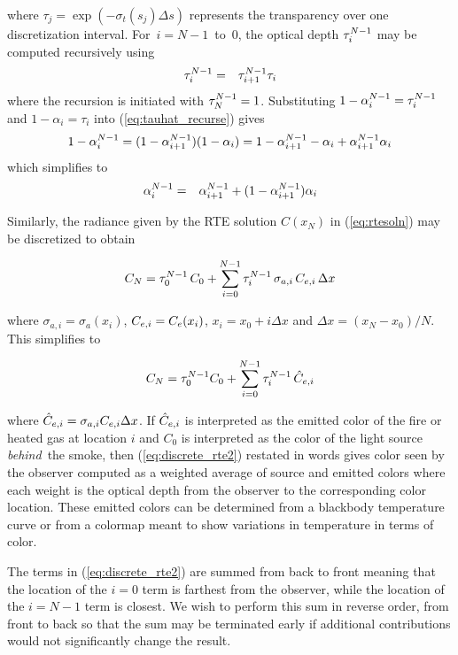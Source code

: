 \noindent where $\tau_j=\exp\left(-\sigma_t(s_j)\Delta s\right)$
represents the transparency over one discretization interval.
For~$i=N-1$~to~$0$, the optical depth $\tau_{i}^{N-1}$ may be computed
recursively using
\begin{eqnarray}
\label{eq:tauhat_recurse}
\tau_{i}^{N-1}&=&\tau_{i+1}^{N-1}\tau_i
\end{eqnarray}
\noindent where the recursion is initiated with $\tau_{N}^{N-1}=1$.
Substituting $1-\alpha_{i}^{N-1}=\tau_{i}^{N-1}$ and $1-\alpha_i=\tau_i$ into
(\ref{eq:tauhat_recurse}) gives
\begin{eqnarray}
1-\alpha_{i}^{N-1}=(1-\alpha_{i+1}^{N-1})(1-\alpha_i)=1-\alpha_{i+1}^{N-1} - \alpha_i + \alpha_{i+1}^{N-1}\alpha_i
\end{eqnarray}
which simplifies to
\begin{eqnarray}
\label{eq:alpha2}
\alpha_{i}^{N-1}&=&\alpha_{i+1}^{N-1} + (1-\alpha_{i+1}^{N-1})\alpha_i
\end{eqnarray}

Similarly, the radiance given by the RTE solution $C(x_N)$ in
(\ref{eq:rtesoln}) may be discretized to obtain

\begin{eqnarray}
C_{N} = \tau_{0}^{N-1}\,C_0 +
\sum_{i=0}^{N-1}\tau_{i}^{N-1}\,\sigma_{a,i}\,C_{e,i}\,\Delta x
\end{eqnarray}

\noindent where $\sigma_{a,i}=\sigma_a(x_i)$, $C_{e,i}=C_e(x_i)$,
$x_i=x_0+i\Delta x$ and $\Delta x=(x_N-x_0)/N$. This simplifies to

\begin{equation}
\label{eq:discrete_rte2}
C_N = \tau_{0}^{N-1}C_0 + \sum_{i=0}^{N-1}\tau_{i}^{N-1}\,\hat{C}_{e,i}
\end{equation}

\noindent where $\hat{C}_{e,i}=\sigma_{a,i}C_{e,i}\Delta x$.  If
$\hat{C}_{e,i}$ is interpreted as the emitted color of the fire or
heated gas at location $i$ and $C_0$ is interpreted as the color
of the light source {\em behind}\ the smoke, then
(\ref{eq:discrete_rte2}) restated in words gives color seen by the
observer computed as a weighted average of source and emitted
colors where each weight is the optical depth from the observer to
the corresponding color location.  These emitted colors can be
determined from a blackbody temperature curve or from a colormap
meant to show variations in temperature in terms of color.


The terms in (\ref{eq:discrete_rte2}) are summed from back to
front meaning that the location of the $i=0$ term is farthest from
the observer, while the location of the $i=N-1$ term is closest.
We wish to perform this sum in reverse order, from front to back
so that the sum may be terminated early if additional
contributions would not significantly change the result.


